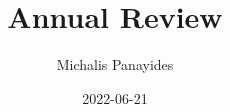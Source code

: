 \documentclass{beamer}
\title{\Large{Annual Review}}
\author{Michalis Panayides}
\date{2022-06-21}
\begin{document}
    \frame{\titlepage}
    
    
    
    
    
\end{document}
